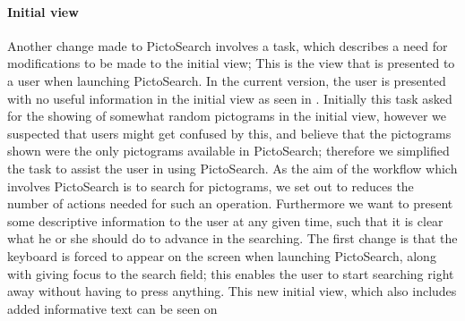 \paragraph{Initial view}
Another change made to PictoSearch involves a task, which describes a need for modifications to be made to the initial view; This is the view that is presented to a user when launching PictoSearch.
In the current version, the user is presented with no useful information in the initial view as seen in . 
Initially this task asked for the showing of somewhat random pictograms in the initial view, however we suspected that users might get confused by this, and believe that the pictograms shown were the only pictograms available in PictoSearch; therefore we simplified the task to assist the user in using PictoSearch. 
As the aim of the workflow which involves PictoSearch is to search for pictograms, we set out to reduces the number of actions needed for such an operation.  
Furthermore we want to present some descriptive information to the user at any given time, such that it is clear what he or she should do to advance in the searching.
The first change is that the keyboard is forced to appear on the screen when launching PictoSearch, along with giving focus to the search field; this enables the user to start searching right away without having to press anything.
This new initial view, which also includes added informative text can be seen on 
